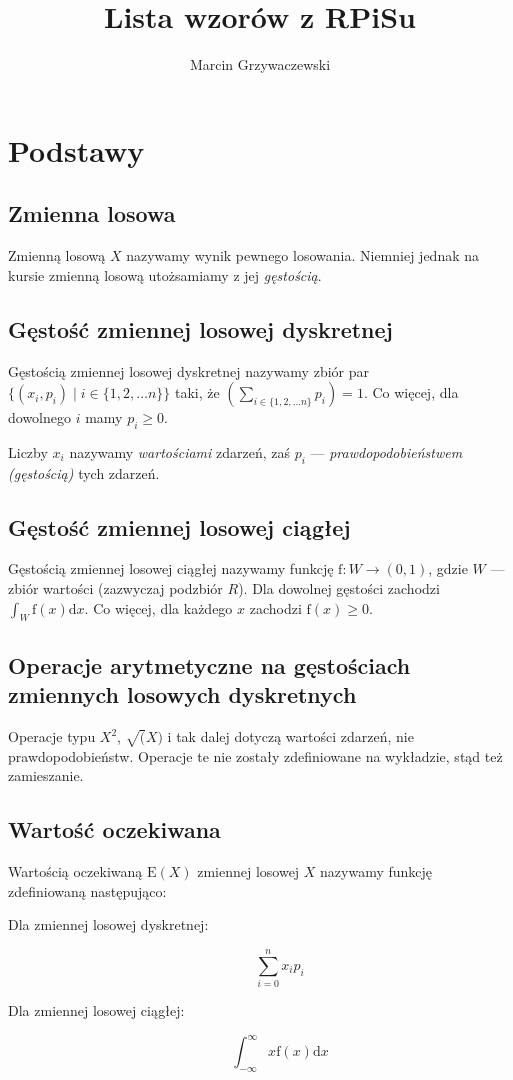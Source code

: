 \documentclass[a4paper,12pt]{article}
\author{Marcin Grzywaczewski}
\title{Lista wzorów z RPiSu}
\begin{document}
\maketitle

\section{Podstawy}

\subsection{Zmienna losowa}
Zmienną losową $X$ nazywamy wynik pewnego losowania. Niemniej jednak na kursie zmienną losową utożsamiamy z jej \emph{gęstością}.

\subsection{Gęstość zmiennej losowej dyskretnej}
Gęstością zmiennej losowej dyskretnej nazywamy zbiór par $\{ \left(x_i,p_i\right) \mid i \in \{ 1, 2, \dots n \} \}$ taki, że $\left(\sum_{i \in \{ 1, 2, \dots n \}} p_i\right) = 1$. Co więcej, dla dowolnego $i$ mamy $p_i \geq 0$.

Liczby $x_i$ nazywamy \emph{wartościami} zdarzeń, zaś $p_i$ --- \emph{prawdopodobieństwem (gęstością)} tych zdarzeń.

\subsection{Gęstość zmiennej losowej ciągłej}
Gęstością zmiennej losowej ciągłej nazywamy funkcję $\textrm{f}:W \rightarrow \left(0,1\right)$, gdzie $W$ --- zbiór wartości (zazwyczaj podzbiór ${R}$). Dla dowolnej gęstości zachodzi $\int_W \textrm{f}(x) \textrm{d}x$. Co więcej, dla każdego $x$ zachodzi $\textrm{f}(x) \geq 0$.

\subsection{Operacje arytmetyczne na gęstościach zmiennych losowych dyskretnych}
Operacje typu $X^2$, $\sqrt(X)$ i tak dalej dotyczą wartości zdarzeń, nie prawdopodobieństw. Operacje te nie zostały zdefiniowane na wykładzie, stąd też zamieszanie.

\clearpage

\subsection{Wartość oczekiwana}
Wartością oczekiwaną $\textrm{E}\left(X\right)$ zmiennej losowej $X$ nazywamy funkcję zdefiniowaną następująco:
\begin{description}
\item[Dla zmiennej losowej dyskretnej:]
  \begin{equation}
    \sum_{i=0}^{n} x_i p_i
  \end{equation}
\item[Dla zmiennej losowej ciągłej:] 
  \begin{equation}
    \int_{-\infty}^{\infty} x\textrm{f}(x)\textrm{d}x
  \end{equation}
\end{description}
\end{document}
